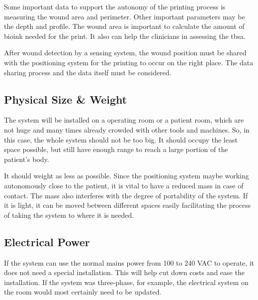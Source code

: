 Some important data to support the autonomy of the printing process is measuring the wound area and perimeter. Other important parameters may be the depth and profile. The wound area is important to calculate the amount of bioink needed for the print. It also can help the clinicians in assessing the \gls{tbsa}. 

After wound detection by a sensing system, the wound position must be shared with the positioning system for the printing to occur on the right place. The data sharing process and the data itself must be considered.


\subsection{Physical Size \& Weight}
\label{subsec:system_architecture_requirements_physical_size}

The system will be installed on a operating room or a patient room, which are not huge and many times already crowded with other tools and machines. So, in this case, the whole system should not be too big. It should occupy the least space possible, but still have enough range to reach a large portion of the patient's body.

It should weight as less as possible. Since the positioning system maybe working autonomously close to the patient, it is vital to have a reduced mass in case of contact. The mass also interferes with the degree of portability of the system. If it is light, it can be moved between different spaces easily facilitating the process of taking the system to where it is needed.


\subsection{Electrical Power}
\label{subsec:system_architecture_requirements_physical_power}

If the system can use the normal mains power from 100 to 240 VAC to operate, it does not need a special installation. This will help cut down costs and ease the installation. If the system was three-phase, for example, the electrical system on the room would most certainly need to be updated.


